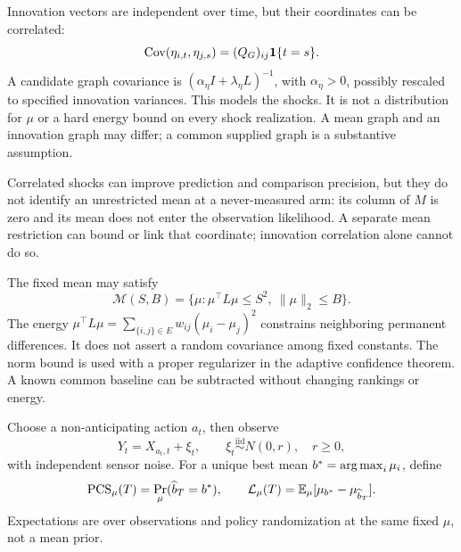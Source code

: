 Innovation vectors are independent over time, but their coordinates can be correlated:
\begin{equation}
\operatorname{Cov}(\eta_{i,t},\eta_{j,s})=(Q_G)_{ij}\mathbf1\{t=s\}.
\end{equation}
A candidate graph covariance is $(\alpha_\eta I+\lambda_\eta L)^{-1}$, with $\alpha_\eta>0$, possibly rescaled to specified innovation variances. This models the shocks. It is not a distribution for $\mu$ or a hard energy bound on every shock realization. A mean graph and an innovation graph may differ; a common supplied graph is a substantive assumption.

Correlated shocks can improve prediction and comparison precision, but they do not identify an unrestricted mean at a never-measured arm: its column of $M$ is zero and its mean does not enter the observation likelihood. A separate mean restriction can bound or link that coordinate; innovation correlation alone cannot do so.

The fixed mean may satisfy
\begin{equation}
\mathcal M(S,B)=\{\mu:\mu^\top L\mu\le S^2,\ \|\mu\|_2\le B\}.
\label{spatiotemporal_bandits:eq:mean-class}
\end{equation}
The energy $\mu^\top L\mu=\sum_{\{i,j\}\in E}w_{ij}(\mu_i-\mu_j)^2$ constrains neighboring permanent differences. It does not assert a random covariance among fixed constants. The norm bound is used with a proper regularizer in the adaptive confidence theorem. A known common baseline can be subtracted without changing rankings or energy.

Choose a non-anticipating action $a_t$, then observe
\begin{equation}
Y_t=X_{a_t,t}+\xi_t,\qquad \xi_t\stackrel{\mathrm{iid}}{\sim}N(0,r),\quad r\ge0,
\end{equation}
with independent sensor noise. For a unique best mean $b^*=\operatorname*{arg\,max}_i\mu_i$, define
\begin{equation}
\operatorname{PCS}_\mu(T)=\Pr_\mu(\widehat b_T=b^*),\qquad
\mathcal L_\mu(T)=\mathbb E_\mu[\mu_{b^*}-\mu_{\widehat b_T}].
\label{spatiotemporal_bandits:eq:target}
\end{equation}
Expectations are over observations and policy randomization at the same fixed $\mu$, not a mean prior.

